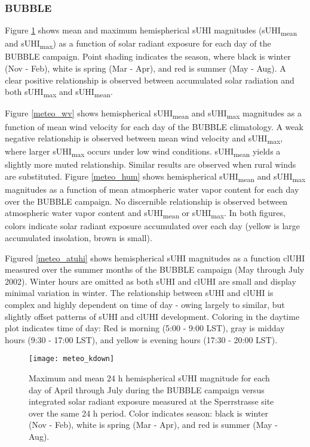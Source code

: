 \begin{bibunit}
\subsubsection{BUBBLE}

Figure \ref{meteo_sol} shows mean and maximum hemispherical sUHI magnitudes (sUHI\textsubscript{mean} and sUHI\textsubscript{max}) as a function of solar radiant exposure for each day of the BUBBLE campaign. Point shading indicates the season, where black is winter (Nov - Feb), white is spring (Mar - Apr), and red is summer (May - Aug). A clear positive relationship is observed between accumulated solar radiation and both sUHI\textsubscript{max} and sUHI\textsubscript{mean}. 

Figure \ref{meteo_wv} shows hemispherical sUHI\textsubscript{mean} and sUHI\textsubscript{max} magnitudes as a function of mean wind velocity for each day of the BUBBLE climatology. A weak negative relationship is observed between mean wind velocity and sUHI\textsubscript{max}, where larger sUHI\textsubscript{max} occurs under low wind conditions. sUHI\textsubscript{mean} yields a slightly more muted relationship. Similar results are observed when rural winds are substituted. Figure \ref{meteo_hum} shows hemispherical sUHI\textsubscript{mean} and sUHI\textsubscript{max} magnitudes as a function of mean atmospheric water vapor content for each day over the BUBBLE campaign. No discernible relationship is observed between atmospheric water vapor content and sUHI\textsubscript{mean} or sUHI\textsubscript{max}.  In both figures, colors indicate solar radiant exposure accumulated over each day (yellow is large accumulated insolation, brown is small).

Figured \ref{meteo_atuhi} shows hemispherical sUHI magnitudes as a function clUHI measured over the summer months of the BUBBLE campaign (May through July 2002). Winter hours are omitted as both sUHI and clUHI are small and display minimal variation in winter. The relationship between sUHI and clUHI is complex and highly dependent on time of day - owing largely to similar, but slightly offset patterns of sUHI and clUHI development. Coloring in the daytime plot indicates time of day: Red is morning (5:00 - 9:00 LST), gray is midday hours (9:30 - 17:00 LST), and yellow is evening hours (17:30 - 20:00 LST).

\pagebreak

\begin{figure}[H]
	\centering
	\texttt{[image: meteo\_kdown]}
	\caption{Maximum and mean 24 \si{\hour} hemispherical sUHI magnitude for each day of April through July during the BUBBLE campaign versus integrated solar radiant exposure measured at the Sperrstrasse site over the same 24 \si{\hour} period. Color indicates season: black is winter (Nov - Feb), white is spring (Mar - Apr), and red is summer (May - Aug). }
	\label{meteo_sol}
\end{figure}


\end{bibunit}
